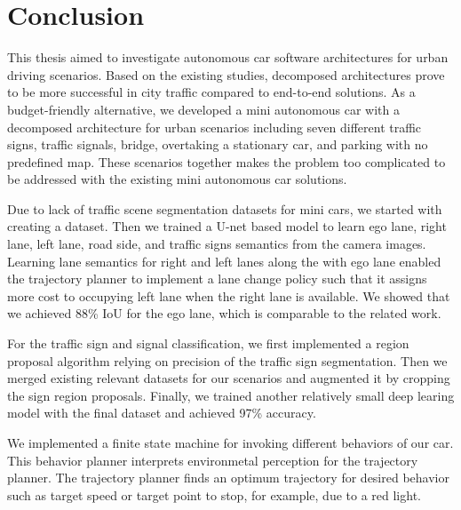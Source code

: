 \chapter{Conclusion}
\label{chp:b7}

This thesis aimed to investigate autonomous car software architectures for
urban driving scenarios. Based on the existing studies, decomposed
architectures prove to be more successful in city traffic compared to
end-to-end solutions. As a budget-friendly alternative, we developed a mini
autonomous car with a decomposed architecture for urban scenarios including
seven different traffic signs, traffic signals, bridge, overtaking a stationary
car, and parking with no predefined map. These scenarios together makes the
problem too complicated to be addressed with the existing mini autonomous car
solutions.

Due to lack of traffic scene segmentation datasets for mini cars, we started
with creating a dataset. Then we trained a U-net based model to learn ego lane,
right lane, left lane, road side, and traffic signs semantics from the camera
images. Learning lane semantics for right and left lanes along the with ego
lane enabled the trajectory planner to implement a lane change policy such that
it assigns more cost to occupying left lane when the right lane is available.
We showed that we achieved 88\% IoU for the ego lane, which is comparable to
the related work.

For the traffic sign and signal classification, we first implemented a region
proposal algorithm relying on precision of the traffic sign segmentation. Then
we merged existing relevant datasets for our scenarios and augmented it by
cropping the sign region proposals. Finally, we trained another relatively
small deep learing model with the final dataset and achieved 97\% accuracy.

We implemented a finite state machine for invoking different behaviors of our
car. This behavior planner interprets environmetal perception for the
trajectory planner. The trajectory planner finds an optimum trajectory for
desired behavior such as target speed or target point to stop, for example, due
to a red light.

